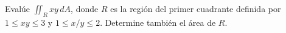 Evalúe $\iint_R xy\,dA$, donde $R$ es la región del primer cuadrante definida por $1\leq xy\leq3$ y $1\leq x/y\leq2$. Determine también el área de $R$.
